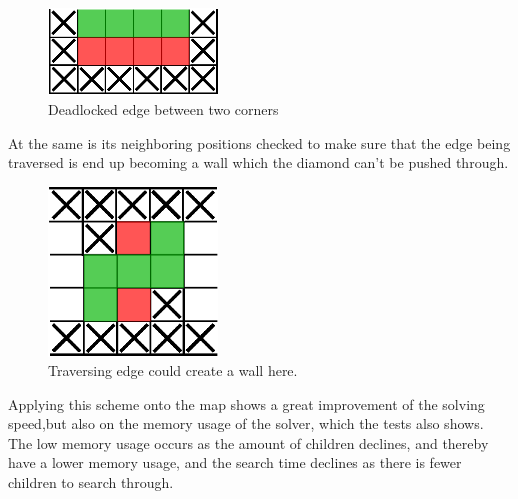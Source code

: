 %

\begin{figure}[H]
    \centering
        \includegraphics[width=0.40\textwidth]{images/deadlock_edge}
        \caption{Deadlocked edge between two corners}
\end{figure}


 At the same is its neighboring positions checked to make sure that the edge being traversed is end up becoming a wall which the diamond can't be pushed through. \\

 
 \begin{figure}[H]
    \centering
        \includegraphics[width=0.40\textwidth]{images/deadlock_opposite}
        \caption{Traversing edge could create a wall here. }
\end{figure}
 
 
 Applying this scheme onto the map shows a great improvement of the solving speed,but also on the memory usage of the solver,  which the tests also shows. The low memory usage occurs as the amount of children declines, and thereby have a lower memory usage, and the search time declines as there is fewer children to search through. \\

